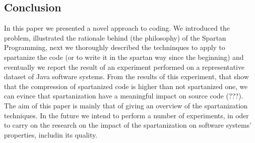 \subsection{Conclusion}
\label{Conclusion}

In this paper we presented a novel approach to coding. We introduced the problem, illustrated the rationale behind (the philosophy) 
of the Spartan Programming, next we thoroughly described the techninques to apply to spartanize the code (or to write it in the spartan 
way since the beginning) and eventually we report the result of an experiment performed on a 
representative dataset of Java software systems. 
From the results of this experiment, that show that the compression of spartanized code is higher than not spartanized one, 
we can evince that spartanization have a meaningful impact on source code (???). 
The aim of this paper is mainly that of giving an overview of the spartanization techniques.
In the future we intend to perform a number of experiments, in oder to carry on the research on the 
impact of the spartanization on software systems' properties, includin its quality. 


